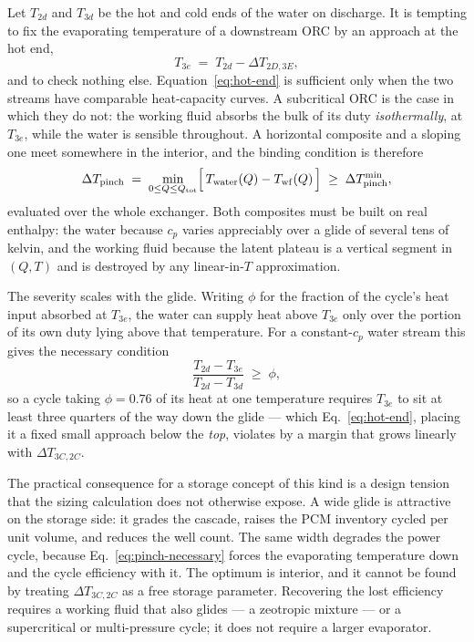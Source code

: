Let $T_{2d}$ and $T_{3d}$ be the hot and cold ends of the water on discharge. It
is tempting to fix the evaporating temperature of a downstream ORC by an
approach at the hot end,
\begin{equation}
  T_{3e} \;=\; T_{2d} - \Delta T_{2D,3E},
  \label{eq:hot-end}
\end{equation}
and to check nothing else. Equation~\eqref{eq:hot-end} is sufficient only when
the two streams have comparable heat-capacity curves. A subcritical ORC is the
case in which they do not: the working fluid absorbs the bulk of its duty
\emph{isothermally}, at $T_{3e}$, while the water is sensible throughout. A
horizontal composite and a sloping one meet somewhere in the interior, and the
binding condition is therefore
\begin{equation}
  \Delta T_{\mathrm{pinch}} \;=\;
  \min_{0 \le Q \le Q_{\mathrm{tot}}}
  \Bigl[\,T_{\mathrm{water}}(Q) - T_{\mathrm{wf}}(Q)\,\Bigr]
  \;\ge\; \Delta T_{\mathrm{pinch}}^{\min},
  \label{eq:pinch}
\end{equation}
evaluated over the whole exchanger. Both composites must be built on real
enthalpy: the water because $c_{p}$ varies appreciably over a glide of several
tens of kelvin, and the working fluid because the latent plateau is a vertical
segment in $(Q,T)$ and is destroyed by any linear-in-$T$ approximation.

The severity scales with the glide. Writing $\phi$ for the fraction of the
cycle's heat input absorbed at $T_{3e}$, the water can supply heat above $T_{3e}$
only over the portion of its own duty lying above that temperature. For a
constant-$c_{p}$ water stream this gives the necessary condition
\begin{equation}
  \frac{T_{2d}-T_{3e}}{T_{2d}-T_{3d}} \;\ge\; \phi ,
  \label{eq:pinch-necessary}
\end{equation}
so a cycle taking $\phi=0.76$ of its heat at one temperature requires
$T_{3e}$ to sit at least three quarters of the way down the glide --- which
Eq.~\eqref{eq:hot-end}, placing it a fixed small approach below the \emph{top},
violates by a margin that grows linearly with $\Delta T_{3C,2C}$.

The practical consequence for a storage concept of this kind is a design
tension that the sizing calculation does not otherwise expose. A wide glide is
attractive on the storage side: it grades the cascade, raises the PCM inventory
cycled per unit volume, and reduces the well count. The same width degrades the
power cycle, because Eq.~\eqref{eq:pinch-necessary} forces the evaporating
temperature down and the cycle efficiency with it. The optimum is interior, and
it cannot be found by treating $\Delta T_{3C,2C}$ as a free storage parameter.
Recovering the lost efficiency requires a working fluid that also glides --- a
zeotropic mixture --- or a supercritical or multi-pressure cycle; it does not
require a larger evaporator.

